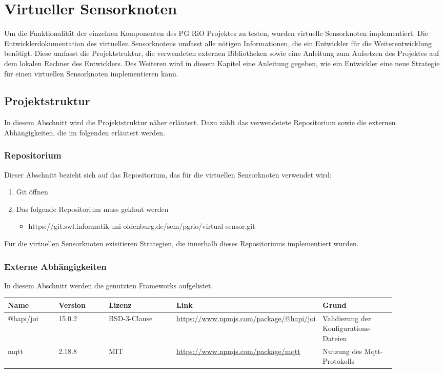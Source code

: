 \section{Virtueller Sensorknoten}
Um die Funktionalität der einzelnen Komponenten des PG RiO Projektes zu testen, wurden virtuelle Sensorknoten implementiert. 
Die Entwicklerdokumentation des virtuellen Sensorknotens umfasst alle nötigen Informationen, die ein Entwickler für die Weiterentwicklung benötigt. 
Diese umfasst die Projektstruktur, die verwendeten externen Bibliotheken sowie eine Anleitung zum Aufsetzen des Projektes auf dem lokalen Rechner des Entwicklers. Des Weiteren wird in diesem Kapitel eine Anleitung gegeben, wie ein Entwickler eine neue Strategie für einen virtuellen Sensorknoten implementieren kann.

\subsection{Projektstruktur}
In diesem Abschnitt wird die Projektstruktur näher erläutert. Dazu zählt das verwendetete Repositorium sowie die externen Abhängigkeiten, die im folgenden erläutert werden.

\subsubsection{Repositorium}
Dieser Abschnitt bezieht sich auf das Repositorium, das für die virtuellen Sensorknoten verwendet wird:
\begin{enumerate}
	\item Git öffnen
	\item Das folgende Repositorium muss geklont werden 
	\begin{itemize}
		\item https://git.swl.informatik.uni-oldenburg.de/scm/pgrio/virtual-sensor.git
	\end{itemize}
\end{enumerate}
Für die virtuellen Sensorknoten exisitieren Strategien, die innerhalb dieses Repositoriums implementiert wurden. 

\subsubsection{Externe Abhängigkeiten}
In diesem Abschnitt werden die genutzten Frameworks aufgelistet.
\begin{table}[htb]
	\begin{tabular}{|p{0.14\linewidth}|p{0.14\linewidth}|p{0.20\linewidth}|p{0.20\linewidth}|p{0.20\linewidth}|}
		\hline
		Name & Version & Lizenz & Link & Grund \\ \hline
		@hapi/joi & 15.0.2 & BSD-3-Clause & \url{https://www.npmjs.com/package/@hapi/joi} & Validierung der Konfigurations-Dateien\\ \hline
		mqtt & 2.18.8 & MIT & \url{https://www.npmjs.com/package/mqtt} & Nutzung des Mqtt-Protokolls \\ \hline
	\end{tabular}
\end{table}

